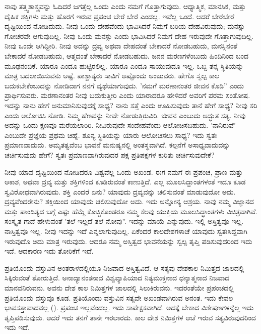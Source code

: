 ನಾವು ತತ್ತ್ವಶಾಸ್ತ್ರವನ್ನು ಓದಿದರೆ ಜಗತ್ತೆಲ್ಲ ಒಂದು ಎಂದು ನಮಗೆ ಗೊತ್ತಾಗುವುದು. ಆಧ್ಯಾತ್ಮಿಕ, ಮಾನಸಿಕ, ಮತ್ತು ದೈಹಿಕ ಶಕ್ತಿಗಳು ಮತ್ತು ಹೊರಗೆ ಇರುವ ಪ್ರಪಂಚ ಬೇರೆ ಬೇರೆ ಎಂದಲ್ಲ. ಇವೆಲ್ಲ ಒಂದೆ. ಆದರೆ ಬೇರೆಬೇರೆ ದೃಷ್ಟಿಯಿಂದ ನೋಡಿದುದು. ನೀವು ಒಂದು ದೇಹವೆಂದು ಭಾವಿಸಿದರೆ ನಿಮಗೆ ಬರಿಯ ದೇಹವಿರುವುದು; ಮನಸ್ಸು ಗೋಚರವೇ ಆಗುವುದಿಲ್ಲ. ನೀವು ಒಂದು ಮನಸ್ಸು ಎಂದು ಭಾವಿಸಿದರೆ ನಿಮಗೆ ದೇಹ ಇರುವುದೇ ಗೊತ್ತಾಗುವುದಿಲ್ಲ. ನೀವು ಒಂದೇ ಆಗಿದ್ದೀರಿ. ನೀವು ಅದನ್ನು ದ್ರವ್ಯ ಅಥವಾ ದೇಹದಂತೆ ಬೇಕಾದರೆ ನೋಡಬಹುದು, ಮನಸ್ಸಿನಂತೆ ಬೇಕಾದರೆ ನೋಡಬಹುದು, ಆತ್ಮದಂತೆ ಬೇಕಾದರೆ ನೋಡಬಹುದು. ಜನನ ಮರಣಗಳೆಂಬುದು ಹಿಂದಿನಿಂದ ಬಂದ ಮೂಢನಂಬಿಕೆ. ಯಾರೂ ಎಂದೂ ಹುಟ್ಟಿರಲಿಲ್ಲ. ಯಾರೂ ಎಂದೂ ಸಾಯುವುದೂ ಇಲ್ಲ. ಒಬ್ಬ ತನ್ನ ಸ್ಥಿತಿಯನ್ನು ಮಾತ್ರ ಬದಲಾಯಿಸುವನು ಅಷ್ಟೆ. ಪಾಶ್ಚಾತ್ಯರು ಸಾವಿಗೆ ಅಷ್ಟೊಂದು ಅಂಜುವರು. ಹೇಗೊ ಸ್ವಲ್ಪ ಕಾಲ ಬದುಕಬೇಕೆಂಬುದನ್ನು ನೋಡಿದಾಗ ನನಗೆ ವ್ಯಥೆಯಾಗುವುದು. 'ನಮಗೆ ಮರಣಾನಂತರ ಜೀವನ ಕೊಡಿ'' ಎಂದು ಪ್ರಾರ್ಥಿಸುವರು. ಮರಣಾನಂತರ ನೀವು ಬದುಕುತ್ತೀರಿ ಎಂದು ಯಾರಾದರೂ ಹೇಳಿದರೆ ಅವರಿಗೆ ಪರಮ ಸಂತೋಷ. ಇದನ್ನು ನಾನು ಹೇಗೆ ಅನುಮಾನಿಸುವುದಕ್ಕೆ ಸಾಧ್ಯ? ನಾನು ಸತ್ತೆ ಎಂದು ಊಹಿಸುವುದು ತಾನೆ ಹೇಗೆ ಸಾಧ್ಯ? ನೀವು ಸರಿ ಎಂದು ಅಲೋಚಿಸಿ ನೋಡಿ. ನಿಮ್ಮ ಹೆಣವನ್ನು ನೀವೇ ನೋಡುತ್ತಿರುವಿರಿ. ಜೀವನ ಎಂಬುದು ಅದ್ಭುತ ಸತ್ಯ. ನೀವು ಅದನ್ನು ಒಂದು ಕ್ಷಣವೂ ಮರೆಯಲಾರಿರಿ. ನೀವಿರುವುದೇ ಸಂದೇಹವೆಂದು ಆಲೋಚಿಸಬಹುದು. 'ನಾನಿರುವೆ' ಎಂಬುದೇ ಪ್ರಜ್ಞೆಯ ಪ್ರಥಮ ಚಿಹ್ನೆ. ಶೂನ್ಯ ಸ್ಥಿತಿಯನ್ನು ಯಾರು ಆಲೋಚಿಸಲು ಸಾಧ್ಯ? ಇದು ಸ್ವತಃ ಪ್ರಮಾಣವಾದುದು. ಅಮೃತತ್ವವೆಂಬ ಭಾವನೆ ಮನುಷ್ಯನಲ್ಲಿ ಅಂತಸ್ಥವಾಗಿದೆ. ಕಲ್ಪನೆಗೆ ಅಸಾಧ್ಯವಾದುದನ್ನು ಚರ್ಚಿಸುವುದು ಹೇಗೆ? ಸ್ವತಃ ಪ್ರಮಾಣವಾಗಿರುವುದರ ಪಕ್ಷ ಪ್ರತಿಪಕ್ಷಗಳ ಕುರಿತು ಚರ್ಚಿಸುವುದೇಕೆ?

ನೀವು ಯಾವ ದೃಷ್ಟಿಯಿಂದ ನೋಡಿದರೂ ವಿಶ್ವವೆಲ್ಲ ಒಂದು ಅಖಂಡ. ಈಗ ನಮಗೆ ಈ ಪ್ರಪಂಚ, ಪ್ರಾಣ ಮತ್ತು ಆಕಾಶ, ಅಥವಾ ದ್ರವ್ಯ ಮತ್ತು ಶಕ್ತಿಗಳಿಂದ ಕೂಡಿರುವಂತೆ ಕಾಣುತ್ತಿದೆ. ಎಲ್ಲ ಮೂಲಸಿದ್ದಾಂತಗಳಂತೆ ಇದೂ ಕೂಡ ಸ್ವವಿರೋಧವಾಗಿರುವುದು. ಶಕ್ತಿ ಎಂದರೆ ಏನು? ಯಾವುದು ದ್ರವ್ಯವನ್ನು ಚಲಿಸುವಂತೆ ಮಾಡುವುದೋ ಅದು. ದ್ರವ್ಯವೆಂದರೇನು? ಶಕ್ತಿಯಿಂದ ಯಾವುದು ಚಲಿಸುವುದೋ ಅದು. ಇದು ಅನ್ನೋನ್ಯ ಆಶ್ರಯ. ನಾವು ನಮ್ಮ ವಿಜ್ಞಾನದ ಮತ್ತು ಪಾಂಡಿತ್ಯದ ಬಗ್ಗೆ ಎಷ್ಟು ಹೆಮ್ಮೆ ಕೊಚ್ಚಿಕೊಂಡರೂ ನಮ್ಮ ಕೆಲವು ಯುಕ್ತಿಯ ಮೂಲಸಿದ್ಧಾಂತಗಳು ವಿಚಿತ್ರವಾಗಿವೆ. ಸಂಸ್ಕೃತ ಗಾದೆ ಹೇಳುವಂತೆ 'ತಲೆ ಇಲ್ಲದೆ ತಲೆ ನೋವು”. ಇದನ್ನು ಮಾಯೆ ಎನ್ನುವುದು. ಇಲ್ಲಿ ಅಸ್ತಿತ್ವವೂ ಇಲ್ಲ. ನಾಸ್ತಿತ್ವವೂ ಇಲ್ಲ. ನೀವು ಇದನ್ನು ಇದೆ ಎನ್ನಲಾಗುವುದಿಲ್ಲ. ಏಕೆಂದರೆ ಕಾಲದೇಶಗಳಾಚೆ ಯಾವುದು ಸ್ವತಃಸಿದ್ದವಾಗಿ ಇರುವುದೊ ಅದು ಮಾತ್ರ ಇರುವುದು. ಆದರೂ ನಮ್ಮ ಅಸ್ತಿತ್ವದ ಭಾವನೆಯನ್ನು ಸ್ವಲ್ಪ ತೃಪ್ತಿ ಪಡಿಸುವುದರಿಂದ ಇದು ಇದೆ. ಆದಕಾರಣ ಇದು ತೋರಿಕೆಗೆ ಇದೆ.

ಪ್ರತಿಯೊಂದು ವಸ್ತುವಿನ ಅಂತರಾಳದಲ್ಲಿಯೂ ನಿಜವಾದ ಅಸ್ತಿತ್ವವಿದೆ. ಆ ಸತ್ಯವು ದೇಶಕಾಲ ನಿಮಿತ್ತದ ಜಾಲದಲ್ಲಿ ಸಿಕ್ಕಿರುವಂತೆ ತೋರುತ್ತಿದೆ. ಅನಾದ್ಯಾನಂತನಾದ ವಿಶ್ವವ್ಯಾಪಿಯಾದ ನಿತ್ಯಮುಕ್ತನಾದ ಧನ್ಯಾತ್ಮನಾದ ನಿಜವಾದ ಮಾನವನಿರುವನು. ಅವನು ದೇಶ ಕಾಲ ನಿಮಿತ್ತಗಳ ಜಾಲದಲ್ಲಿ ಸಿಲುಕಿರುವನು. ಇದರಂತೆಯೇ ಪ್ರಪಂಚದಲ್ಲಿ ಪ್ರತಿಯೊಂದು ವಸ್ತುವೂ ಕೂಡ. ಪ್ರತಿಯೊಂದು ವಸ್ತುವಿನ ಸತ್ಯವೇ ಅಖಂಡವಾಗಿರುವ ಅನಂತ. ಇದು ಕೇವಲ ಭಾವಸತ್ತಾವಾದವಲ್ಲ (). ಪ್ರಪಂಚ ಇಲ್ಲವೆಂದಲ್ಲ. ಇದು ಸಾಪೇಕ್ಷಕವಾಗಿದೆ. ಅದಕ್ಕೆ ಬೇಕಾದ ವಿಶೇಷಣಗಳನ್ನೆಲ್ಲ ಇದು ತೃಪ್ತಿಪಡಿಸುವುದು. ಆದರೆ ಇದು ತನಗೆ ತಾನೇ ಇರಲಾರದು. ಕಾಲ ದೇಶ ನಿಮಿತ್ತಗಳ ಆಚೆ ಇರುವ ಸತ್ಯವಿರುವುದರಿಂದ ಇದು ಇದೆ.

